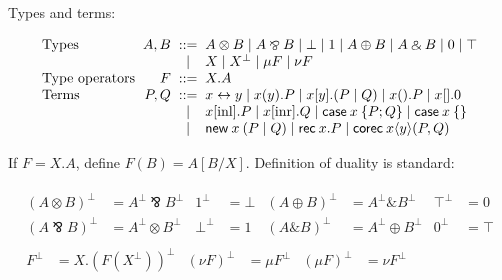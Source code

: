 \documentclass[orivec,envcountsame]{llncs}
\newcommand{\with}{\mathbin\binampersand}
\newcommand{\parr}{\mathbin\bindnasrepma}
\newcommand{\cpdual}[1]{#1^\perp}
\newcommand{\mkwd}[1]{\mathsf{#1}}
\newcommand{\link}[2]{#1 \leftrightarrow #2}
\newcommand{\cut}[4]{\mkwd{new}\:#1 \: (#3 \mid #4)}
\newcommand{\rec}[1]{\mkwd{rec}\:#1}
\newcommand{\corec}[5]{\mkwd{corec}\:#1 \langle #2 \rangle (#4,#5)}
\newcommand{\clabel}[1]{\mathrm{#1}}
\renewcommand{\case}[2]{\mkwd{case}\:#1\:\{#2\}}
\newcommand{\sel}[2]{#1[\clabel{#2}]}
\begin{document}
Types and terms:

{\small
\[\begin{array}{l@{\hspace{2mm}}r@{\hspace{2mm}}c@{\hspace{2mm}}l}
  \text{Types} & A,B & ::= & A \otimes B \mid A \parr B \mid \bot \mid 1 \mid A \oplus B \mid A \with B \mid 0 \mid \top \\
   & & \mid & X \mid \cpdual{X} \mid \mu F \mid \nu F \\
   \text{Type operators} & F & ::= & X.A \\
  \text{Terms} & P,Q & ::= & \link{x}{y} \mid x(y).P \mid x[y].(P \mid Q) \mid x().P \mid x[].0 \\
   & & \mid & \sel{x}{inl}.P \mid \sel{x}{inr}.Q \mid \case{x}{P;Q} \mid \case{x}{} \\
   & & \mid & \cut{x}{A}{P}{Q} \mid \rec{x}.P \mid \corec{x}{y}{A}{P}{Q}
\end{array}\]}

If $F = X.A$, define $F(B) = A[B/X]$.  Definition of duality is standard:

{\small\begin{gather*}
\begin{aligned}
  \cpdual{(A \otimes B)} &= \cpdual{A} \parr \cpdual{B} & \cpdual{1} &= \bot &
    \cpdual{(A \oplus B)} &= \cpdual{A} \with \cpdual{B} & \cpdual{\top} &= 0 \\
  \cpdual{(A \parr B)} &= \cpdual{A} \otimes \cpdual{B} & \cpdual{\bot} &= 1 &
    \cpdual{(A \with B)} &= \cpdual{A} \oplus \cpdual{B} & \cpdual{0} &= \top
\end{aligned}\\
\begin{aligned}
\cpdual{F} &= X.\cpdual{(F(\cpdual{X}))} & \cpdual{(\nu F)} &= \mu \cpdual{F} & \cpdual{(\mu F)} &= \nu \cpdual{F}
\end{aligned}
\end{gather*}}
\end{document}
